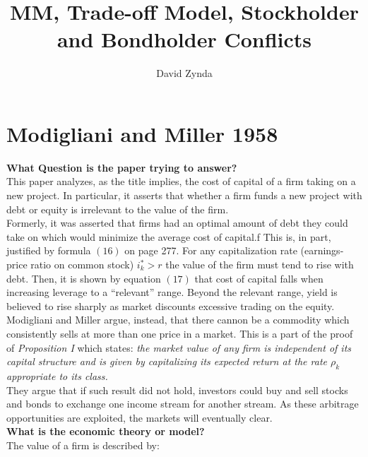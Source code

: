 \documentclass[10pt,a4paper]{article}
\author{David Zynda}
\title{MM, Trade-off Model, Stockholder and Bondholder Conflicts}
\begin{document}
\maketitle


\section{Modigliani and Miller 1958}

\textbf{What Question is the paper trying to answer?} \\

This paper analyzes, as the title implies, the cost of capital of a firm taking on a new project. In particular, it asserts that whether a firm funds a new project with debt or equity is irrelevant to the value of the firm. \\

Formerly, it was asserted that firms had an optimal amount of debt they could take on which would minimize the average cost of capital.f This is, in part, justified by formula $(16)$ on page 277. For any capitalization rate (earnings-price ratio on common stock) $i_k^* > r$ the value of the firm must tend to rise with debt. Then, it is shown by equation $(17)$ that cost of capital falls when increasing leverage to a ``relevant'' range. Beyond the relevant range, yield is believed to rise sharply as market discounts excessive trading on the equity. \\

Modigliani and Miller argue, instead, that there cannon be a commodity which consistently sells at more than one price in a market. This is a part of the proof of \textit{Proposition I} which states: \textit{the market value of any firm is independent of its capital structure and is given by capitalizing its expected return at the rate $\rho_k$ appropriate to its class.} \\

They argue that if such result did not hold, investors could buy and sell stocks and bonds to exchange one income stream for another stream. As these arbitrage opportunities are exploited, the markets will eventually clear. \\





\noindent \textbf{What is the economic theory or model?} \\

\noindent The value of a firm is described by: 
\end{document}
